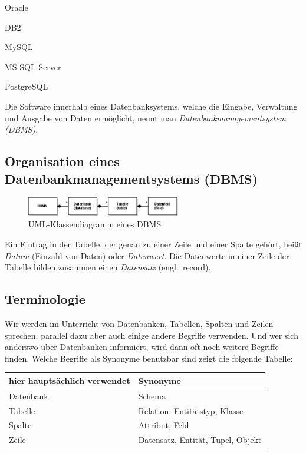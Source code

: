 \begin{compactitem}
  \item Oracle
  \item DB2
  \item MySQL
  \item MS SQL Server
  \item PostgreSQL
\end{compactitem}

Die Software innerhalb eines Datenbanksystems, welche die Eingabe, Verwaltung
und Ausgabe von Daten ermöglicht, nennt man \emph{Datenbankmanagementsystem
(DBMS)}.

\subsection{Organisation eines Datenbankmanagementsystems (DBMS)}

\begin{figure}[h]
  \centering
   \includegraphics[width=0.60\textwidth]{./inf/SEKII/32_SQL_Einfuehrung/DBMS}
   \caption{UML-Klassendiagramm eines DBMS}
   \label{fig:dbms}
\end{figure}

Ein Eintrag in der Tabelle, der genau zu einer Zeile und einer Spalte gehört,
heißt \textit{Datum} (Einzahl von Daten) oder \emph{Datenwert}. Die Datenwerte
in einer Zeile der Tabelle bilden zusammen einen \emph{Datensatz} (engl.\
record).

\subsection{Terminologie}

Wir werden im Unterricht von Datenbanken, Tabellen, Spalten und Zeilen sprechen,
parallel dazu aber auch einige andere Begriffe verwenden. Und wer sich anderswo
über Datenbanken informiert, wird dann oft noch weitere Begriffe finden. Welche
Begriffe als Synonyme benutzbar sind zeigt die folgende Tabelle:

\begin{center}
\bgroup
\def\arraystretch{1.2}
\begin{tabularx}{0.75\textwidth}{|X|p{60mm}|}\hline
\textbf{hier hauptsächlich verwendet} & \textbf{Synonyme} \\ \hline 
Datenbank & Schema \\ \hline 
Tabelle & Relation, Entitätstyp, Klasse \\ \hline 
Spalte & Attribut, Feld \\ \hline
Zeile & Datensatz, Entität, Tupel, Objekt \\ \hline
\end{tabularx}
\egroup
\end{center}

